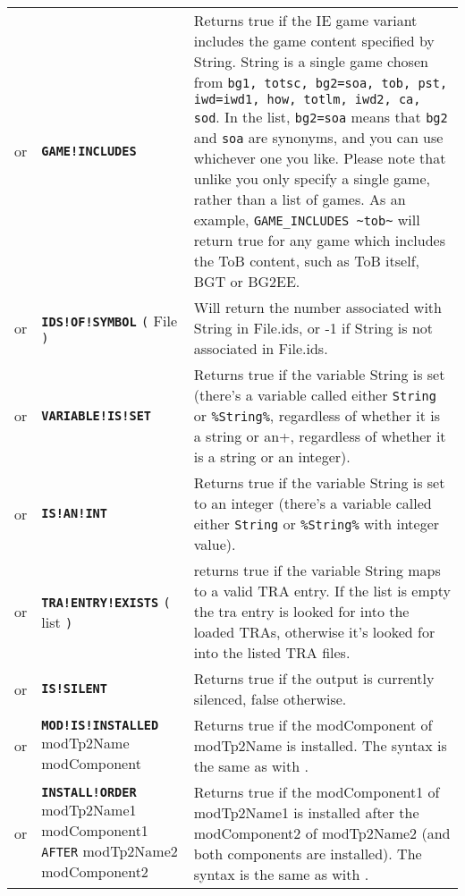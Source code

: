 \documentclass{article}
\def\ttref#1{\ahrefloc{#1}{\tt #1}}
\def\DEFINE#1{{\tt \bf #1}\label{#1}\index{#1}}
\def\DEFSYN#1{{\tt \bf #1}\index{#1}}
\def\t#1{{\tt #1}}
\def\Slist{{\color{red} list }}
\begin{document}
\begin{tabular}{cp{10in}|p{10in}}
or & \DEFINE{GAME!INCLUDES} \ttref{String} &

Returns true if the IE game variant includes the game content
specified by String. String is a single game chosen from
\verb+bg1, totsc, bg2=soa, tob, pst, iwd=iwd1, how, totlm, iwd2, ca, sod+. In
the list, \verb+bg2=soa+ means that \verb+bg2+ and \verb+soa+ are
synonyms, and you can use whichever one you like. Please note that
unlike \ttref{GAME!IS} you only specify a single game, rather than a
list of games. As an example, \verb+GAME_INCLUDES ~tob~+ will return
true for any game which includes the ToB content, such as ToB itself,
BGT or BG2EE. \\

or & \DEFINE{IDS!OF!SYMBOL} \t{(} File \ttref{String} \t{)} &
Will return the number associated with String in File.ids,
or -1 if String is not associated in File.ids. \\

or & \DEFINE{VARIABLE!IS!SET} \ttref{String} &
Returns true if the variable String is set (there's a variable called either
\verb+String+ or \verb+%String%+, regardless of whether it is a string or an
integer).  \\

or & \DEFSYN{IS!AN!INT} \ttref{String} &
Returns true if the variable String is set to an integer (there's a variable called either
\verb+String+ or \verb+%String%+ with integer value).  \\
or & \DEFINE{TRA!ENTRY!EXISTS} \t{(} \ttref{String} \ttref{String} \Slist \t{)} &
	returns true if the variable String maps to a valid TRA entry.
	If the \ttref{String} list is empty the tra entry is looked for into the loaded TRAs,
	otherwise it's looked for into the listed TRA files.
\\
or & \DEFSYN{IS!SILENT} &
Returns true if the output is currently silenced, false otherwise.  \\

or & \DEFINE{MOD!IS!INSTALLED} modTp2Name modComponent &
Returns true if the modComponent of modTp2Name is installed. The syntax
is the same as with \ttref {REQUIRE!COMPONENT}.  \\

or & \DEFINE{INSTALL!ORDER} modTp2Name1 modComponent1 \t{AFTER} modTp2Name2 modComponent2 &
Returns true if the modComponent1 of modTp2Name1 is installed after the modComponent2
of modTp2Name2 (and both components are installed). The syntax
is the same as with \ttref {REQUIRE!COMPONENT}.  \\


\end{tabular}
\end{document}
